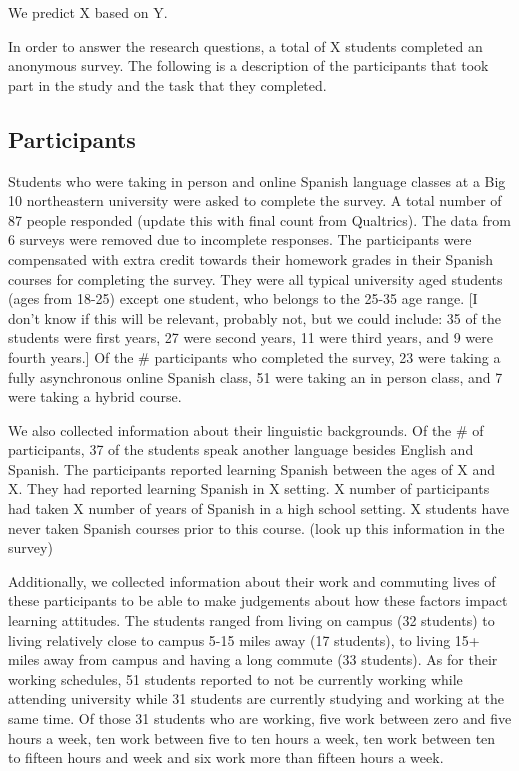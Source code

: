\documentclass[
  man]{apa6}
\begin{document}
We predict X based on Y.

In order to answer the research questions, a total of X students completed an anonymous survey. The following is a description of the participants that took part in the study and the task that they completed.

\hypertarget{participants}{%
\subsection{Participants}\label{participants}}

Students who were taking in person and online Spanish language classes at a Big 10 northeastern university were asked to complete the survey.
A total number of 87 people responded (update this with final count from Qualtrics).
The data from 6 surveys were removed due to incomplete responses.
The participants were compensated with extra credit towards their homework grades in their Spanish courses for completing the survey.
They were all typical university aged students (ages from 18-25) except one student, who belongs to the 25-35 age range.
{[}I don't know if this will be relevant, probably not, but we could include: 35 of the students were first years, 27 were second years, 11 were third years, and 9 were fourth years.{]}
Of the \# participants who completed the survey, 23 were taking a fully asynchronous online Spanish class, 51 were taking an in person class, and 7 were taking a hybrid course.

We also collected information about their linguistic backgrounds.
Of the \# of participants, 37 of the students speak another language besides English and Spanish.
The participants reported learning Spanish between the ages of X and X.
They had reported learning Spanish in X setting.
X number of participants had taken X number of years of Spanish in a high school setting.
X students have never taken Spanish courses prior to this course. (look up this information in the survey)

Additionally, we collected information about their work and commuting lives of these participants to be able to make judgements about how these factors impact learning attitudes.
The students ranged from living on campus (32 students) to living relatively close to campus 5-15 miles away (17 students), to living 15+ miles away from campus and having a long commute (33 students).
As for their working schedules, 51 students reported to not be currently working while attending university while 31 students are currently studying and working at the same time.
Of those 31 students who are working, five work between zero and five hours a week, ten work between five to ten hours a week, ten work between ten to fifteen hours and week and six work more than fifteen hours a week.
\end{document}
